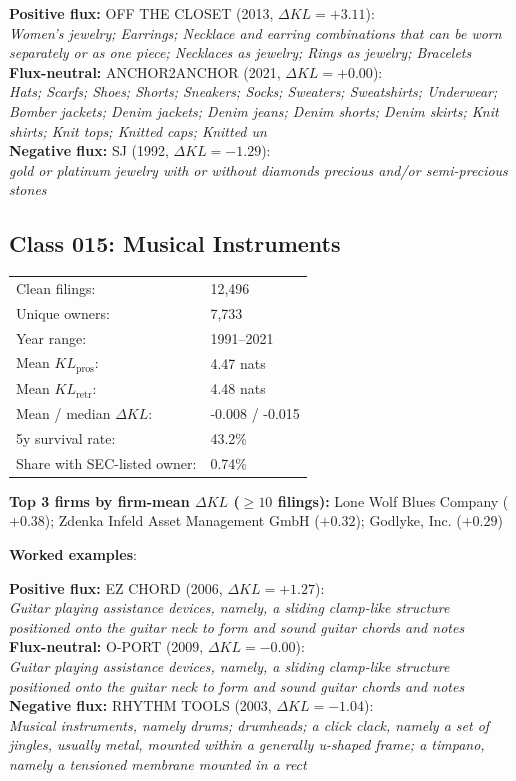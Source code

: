   \textbf{Positive flux:} \textsc{OFF THE CLOSET} (2013, $\Delta KL=+3.11$):\\
  \textit{Women's jewelry; Earrings; Necklace and earring combinations that can be worn separately or as one piece; Necklaces as jewelry; Rings as jewelry; Bracelets}\\
  \textbf{Flux-neutral:} \textsc{ANCHOR2ANCHOR} (2021, $\Delta KL=+0.00$):\\
  \textit{Hats; Scarfs; Shoes; Shorts; Sneakers; Socks; Sweaters; Sweatshirts; Underwear; Bomber jackets; Denim jackets; Denim jeans; Denim shorts; Denim skirts; Knit shirts; Knit tops; Knitted caps; Knitted un}\\
  \textbf{Negative flux:} \textsc{SJ} (1992, $\Delta KL=-1.29$):\\
  \textit{gold or platinum jewelry with or without diamonds precious and/or semi-precious stones}\\

\subsection*{Class 015: Musical Instruments}
\label{app:industry-015}

\begin{tabular}{ll}
Clean filings: & 12,496 \\
Unique owners: & 7,733 \\
Year range: & 1991--2021 \\
Mean $KL_\text{pros}$: & 4.47 nats \\
Mean $KL_\text{retr}$: & 4.48 nats \\
Mean / median $\Delta KL$: & -0.008 / -0.015 \\
5y survival rate: & 43.2\% \\
Share with SEC-listed owner: & 0.74\% \\
\end{tabular}

\textbf{Top 3 firms by firm-mean $\Delta KL$ ($\geq 10$ filings):} Lone Wolf Blues Company ($+0.38$); Zdenka Infeld Asset Management GmbH ($+0.32$); Godlyke, Inc. ($+0.29$)

\textbf{Worked examples}:

  \textbf{Positive flux:} \textsc{EZ CHORD} (2006, $\Delta KL=+1.27$):\\
  \textit{Guitar playing assistance devices, namely, a sliding clamp-like structure positioned onto the guitar neck to form and sound guitar chords and notes}\\
  \textbf{Flux-neutral:} \textsc{O-PORT} (2009, $\Delta KL=-0.00$):\\
  \textit{Guitar playing assistance devices, namely, a sliding clamp-like structure positioned onto the guitar neck to form and sound guitar chords and notes}\\
  \textbf{Negative flux:} \textsc{RHYTHM TOOLS} (2003, $\Delta KL=-1.04$):\\
  \textit{Musical instruments, namely drums; drumheads; a click clack, namely a set of jingles, usually metal, mounted within a generally u-shaped frame; a timpano, namely a tensioned membrane mounted in a rect}\\

